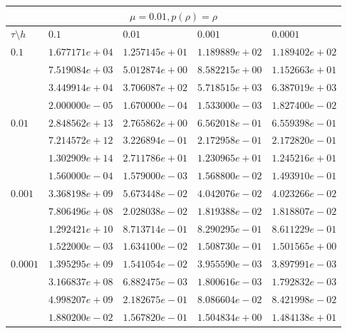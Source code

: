 \documentclass[12pt,a4paper]{article}
\begin{document}
\begin{tabular}{ |l|l|l|l|l| }
    \hline
    \multicolumn{5}{|c|}{$\mu = 0.01, p(\rho)  = \rho$}\\
    \hline
    $\tau\setminus h$ & $0.1$ & $0.01$ & $0.001$ & $0.0001$\\
    \hline
    $0.1$ & $1.677171e+04$ & $1.257145e+01$ & $1.189889e+02$ & $1.189402e+02$ \\
    & $7.519084e+03$ & $5.012874e+00$ & $8.582215e+00$ & $1.152663e+01$ \\
    & $3.449914e+04$ & $3.706087e+02$ & $5.718515e+03$ & $6.387019e+03$ \\
    & $2.000000e-05$ & $1.670000e-04$ & $1.533000e-03$ & $1.827400e-02$ \\
    \hline
    $0.01$ & $2.848562e+13$ & $2.765862e+00$ & $6.562018e-01$ & $6.559398e-01$ \\
    & $7.214572e+12$ & $3.226894e-01$ & $2.172958e-01$ & $2.172820e-01$ \\
    & $1.302909e+14$ & $2.711786e+01$ & $1.230965e+01$ & $1.245216e+01$ \\
    & $1.560000e-04$ & $1.579000e-03$ & $1.568800e-02$ & $1.493910e-01$ \\
    \hline
    $0.001$ & $3.368198e+09$ & $5.673448e-02$ & $4.042076e-02$ & $4.023266e-02$ \\
    & $7.806496e+08$ & $2.028038e-02$ & $1.819388e-02$ & $1.818807e-02$ \\
    & $1.292421e+10$ & $8.713714e-01$ & $8.290295e-01$ & $8.611229e-01$ \\
    & $1.522000e-03$ & $1.634100e-02$ & $1.508730e-01$ & $1.501565e+00$ \\
    \hline
    $0.0001$ & $1.395295e+09$ & $1.541054e-02$ & $3.955590e-03$ & $3.897991e-03$ \\
    & $3.166837e+08$ & $6.882475e-03$ & $1.800616e-03$ & $1.792832e-03$ \\
    & $4.998207e+09$ & $2.182675e-01$ & $8.086604e-02$ & $8.421998e-02$ \\
    & $1.880200e-02$ & $1.567820e-01$ & $1.504834e+00$ & $1.484138e+01$ \\
    \hline
\end{tabular}
\end{document}
